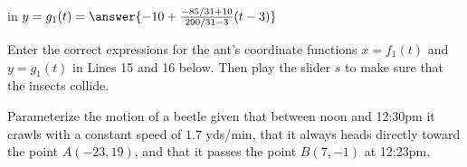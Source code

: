 \documentclass{ximera}
\begin{document}
\begin{explanation}
\begin{question}
         in $y=g_1(t) =  \answer{-10+\frac{-85/31+10}{290/31-3}(t-3)}$
    \end{question}


\begin{exploration}\label{exp:pc1c}
Enter the correct expressions for the ant's coordinate functions $x=f_1(t)$ and $y=g_1(t)$ in Lines 15 and 16 below. Then play the slider $s$ to make sure that the insects collide.

 
\begin{onlineOnly}
    \begin{center}
\end{center}
\end{onlineOnly}
\end{exploration}

\end{explanation}


\begin{example} \label{Ex3}

Parameterize the motion of a beetle given that between noon and 12:30pm it crawls with a constant speed of $1.7$ yds/min, that it always heads directly toward the point $A(-23,19)$, and that it passes the point $B(7,-1)$ at 12:23pm. 

\end{example}
\end{document}
